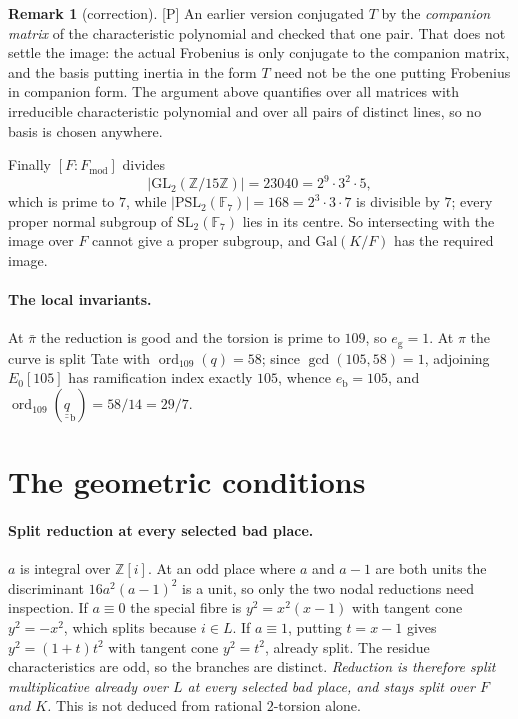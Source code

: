 \documentclass[11pt]{article}
\theoremstyle{plain}
\theoremstyle{definition}
\newtheorem{remark}{Remark}
\newcommand{\Fmod}{F_{\mathrm{mod}}}
\newcommand{\ord}{\operatorname{ord}}
\begin{document}
\begin{remark}[correction]\label{r:basis}
\textup{[P]} An earlier version conjugated $T$ by the \emph{companion matrix} of the
characteristic polynomial and checked that one pair.  That does not settle the image:
the actual Frobenius is only conjugate to the companion matrix, and the basis putting
inertia in the form $T$ need not be the one putting Frobenius in companion form.  The
argument above quantifies over all matrices with irreducible characteristic polynomial
and over all pairs of distinct lines, so no basis is chosen anywhere.
\end{remark}
  Finally $[F:\Fmod]$ divides
\[
 |\mathrm{GL}_2(\mathbb Z/15\mathbb Z)|=23040=2^9\cdot3^2\cdot5 ,
\]
which is prime to $7$, while $|\mathrm{PSL}_2(\mathbb F_7)|=168=2^3\cdot3\cdot7$ is
divisible by $7$; every proper normal subgroup of $\mathrm{SL}_2(\mathbb F_7)$ lies
in its centre.  So intersecting with the image over $F$ cannot give a proper
subgroup, and $\mathrm{Gal}(K/F)$ has the required image.

\paragraph{The local invariants.}
At $\bar\pi$ the reduction is good and the torsion is prime to $109$, so
$e_{\mathrm g}=1$.  At $\pi$ the curve is split Tate with $\ord_{109}(q)=58$; since
$\gcd(105,58)=1$, adjoining $E_0[105]$ has ramification index exactly $105$, whence
$e_{\mathrm b}=105$, and $\ord_{109}(\underline{\underline q}_{\mathrm b})=58/14=29/7$.

\section{The geometric conditions}\label{s:geom}

\paragraph{Split reduction at every selected bad place.}
$a$ is integral over $\mathbb{Z}[i]$.  At an odd place where $a$ and $a-1$ are both
units the discriminant $16a^2(a-1)^2$ is a unit, so only the two nodal reductions
need inspection.  If $a\equiv0$ the special fibre is $y^2=x^2(x-1)$ with tangent
cone $y^2=-x^2$, which splits because $i\in L$.  If $a\equiv1$, putting $t=x-1$
gives $y^2=(1+t)t^2$ with tangent cone $y^2=t^2$, already split.  The residue
characteristics are odd, so the branches are distinct.  \emph{Reduction is
therefore split multiplicative already over $L$ at every selected bad place, and
stays split over $F$ and $K$.}  This is not deduced from rational $2$-torsion
alone.
\end{document}
